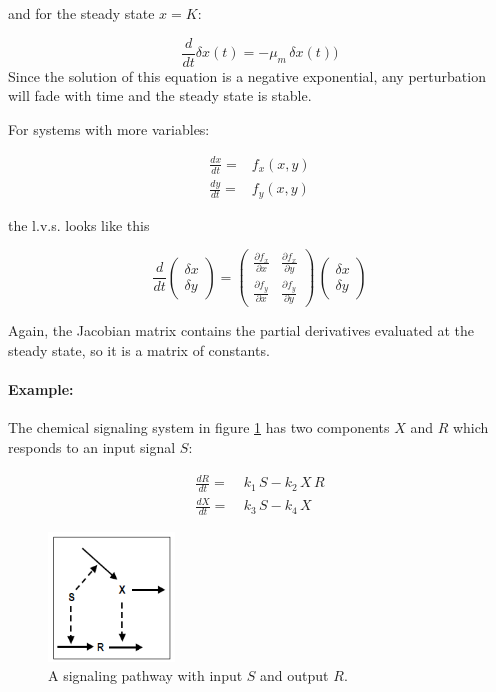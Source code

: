 \documentclass{tufte-book} %
\begin{document}
and for the steady state $x=K$:

 \begin{equation}
	\frac{d}{dt}\delta x(t)  = -  \mu_m \,  \delta x(t))  \nonumber
\end{equation}Since the solution of this equation is a negative exponential, any perturbation will fade with time and the steady state is stable.

For systems with more variables:

\begin{align}
	\frac{dx}{dt}=&f_x(x,y)  \nonumber\\
	\frac{dy}{dt}=&f_y(x,y)  \nonumber
\end{align}

the l.v.s. looks like this

 \begin{equation}
 	\label{fig:svlnvar}
	\frac{d}{dt} \begin{pmatrix} \delta x\\ \delta y \end{pmatrix}= \begin{pmatrix} \frac{\partial f_x}{\partial x} & \frac{\partial f_x}{\partial y}\\ \frac{\partial f_y}{\partial x} & \frac{\partial f_y}{\partial y} \end{pmatrix} \, \begin{pmatrix} \delta x\\ \delta y \end{pmatrix}
\end{equation}

Again, the Jacobian matrix contains the partial derivatives evaluated at the steady state, so it is a matrix of constants.

\paragraph{Example:} The chemical signaling system in figure \ref{fig:signalpathd} has two components $X$ and $R$ which responds to an input signal $S$:

\begin{align}
	\frac{dR}{dt} =&\: k_1 \, S - k_2 \, X \, R  \nonumber\\
	\frac{dX}{dt} =&\: k_3 \, S - k_4 \, X  \nonumber
\end{align}

\begin{figure}
	\begin{center}
		\includegraphics[width=0.3\textwidth]{signalpathd}
	\end{center}
	\caption{A signaling pathway with input $S$ and output $R$. }
	\label{fig:signalpathd}
\end{figure}
\end{document}
